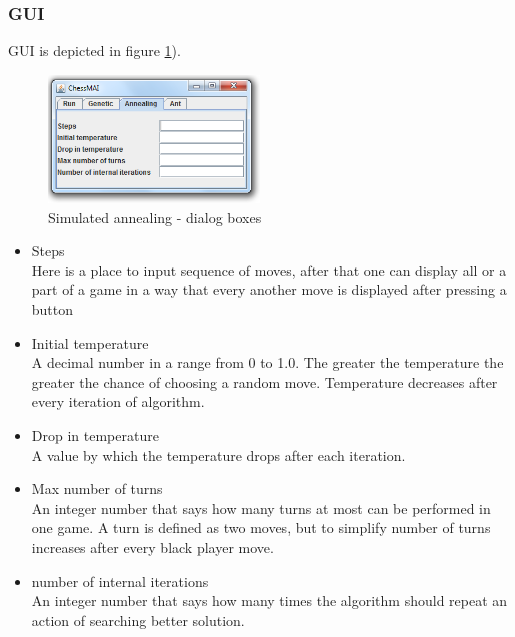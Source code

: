 \documentclass[pdftex]{article}
\begin{document}
\subsubsection{GUI}
GUI is depicted in figure \ref{fig:annealingTab}).
\begin{figure}[!htb]
	\centering
	\includegraphics[width=0.5\textwidth]{annealing/GUI.png} 
	\caption{Simulated annealing - dialog boxes}
	\label{fig:annealingTab}
\end{figure}

\begin{itemize}
 	\item Steps \hfill \\
Here is a place to input sequence of moves, after that one can display all or a part of a game in a way that every another move is displayed after pressing  a button

	\item Initial temperature \hfill \\
A decimal number in a range from 0 to 1.0. The greater the temperature the greater the chance of choosing a random move. Temperature decreases after every iteration of algorithm.
 	\item Drop in temperature \hfill \\
A value by which the temperature drops after each iteration.
	\item Max number of turns \hfill \\
An integer number that says how many turns at most can be performed in one game. A turn is defined as two moves, but to simplify number of turns increases after every black player move.
	\item number of internal iterations \hfill \\
An integer number that says how many times the algorithm should repeat an action of searching better solution.
\end{itemize}
\end{document}
